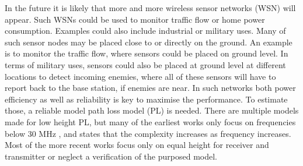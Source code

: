 
In the future it is likely that more and more wireless sensor networks (WSN) will appear. Such WSNs could be used to monitor traffic flow or home power consumption. Examples could also include industrial or military uses. Many of such sensor nodes may be placed close to or directly on the ground. An example is to monitor the traffic flow, where sensors could be placed on ground level. In terms of military uses, sensors could also be placed at ground level at different locations to detect incoming enemies, where all of these sensors will have to report back to the base station, if enemies are near. In such networks both power efficiency as well as reliability is key to maximise the performance. To estimate those, a reliable model path loss model (PL) is needed.
There are multiple models made for low height PL, but many of the earliest works only focus on frequencies below 30 MHz \cite{Bullington}, and states that the complexity increases as frequency increases. Most of the more recent works focus only on equal height for receiver and transmitter or neglect a verification of the purposed model. 


